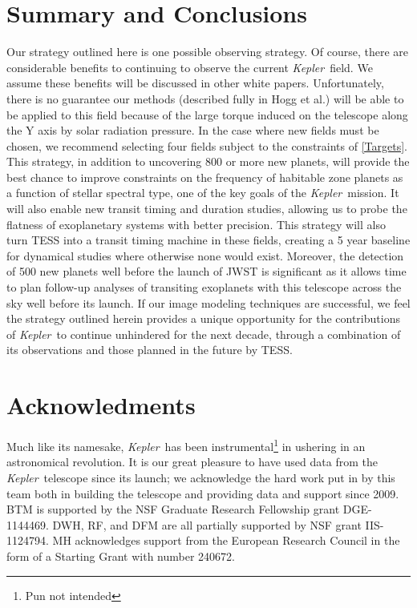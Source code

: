 \documentclass[12pt, preprint]{aastex}
\newcommand{\observatory}[1]{\textsl{#1}}
\newcommand{\kepler}{\observatory{Kepler}}
\newcommand{\Kepler}{\kepler}
\begin{document}
\section{Summary and Conclusions}
\label{SC}
Our strategy outlined here is one possible observing strategy. 
Of course, there are considerable benefits to continuing to observe the 
 current \Kepler\ field. We assume these benefits will be discussed in other 
 white papers. 
Unfortunately, there is no guarantee our methods (described fully in Hogg 
 et al.) will be able to be applied to this field because of the large torque
 induced on the telescope along the Y axis by solar radiation pressure.
In the case where new fields must be chosen, we recommend selecting four 
 fields subject to the constraints of \textsection\ref{Targets}. 
This strategy, in addition to uncovering 800 or more new planets, 
 will provide the best chance to improve constraints on the frequency of 
 habitable zone planets as a function of stellar spectral type, one of the 
 key goals of the \Kepler\ mission. 
It will also enable new transit timing and duration studies, allowing us to 
 probe the flatness of exoplanetary systems with better precision.
This strategy will also turn TESS into a transit timing machine in these fields,
 creating a 5 year baseline for dynamical studies where otherwise none would 
 exist.
Moreover, the detection of 500 new planets well before the launch of JWST is 
 significant as it allows time to plan follow-up analyses of transiting 
 exoplanets with this telescope across the sky well before its launch.
If our image modeling techniques are successful, we feel the strategy outlined
 herein provides a unique opportunity for the contributions of \Kepler\ 
 to continue unhindered for the next decade, through a combination of its 
 observations and those planned in the future by TESS. 

\section{Acknowledments}
Much like its namesake, \Kepler\ has been instrumental\footnote{Pun not 
 intended} in ushering in an astronomical revolution.
It is our great pleasure to have used data from the \Kepler\ telescope since 
 its launch; we acknowledge the hard work put in by this team both in building 
 the telescope and providing data and support since 2009.
BTM is supported by the NSF Graduate Research Fellowship grant DGE-1144469.
DWH, RF, and DFM are all partially supported by NSF grant IIS-1124794.
MH acknowledges support from the European Research Council in the form of a 
 Starting Grant with number 240672.
\end{document}
